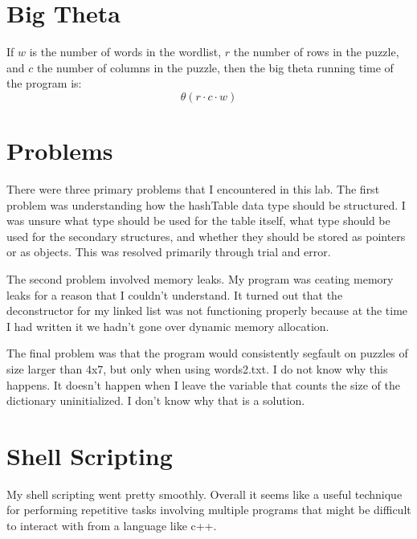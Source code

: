 \documentclass{article} %
\begin{document}
\section{Big Theta}
If $w$ is the number of words in the wordlist, $r$ the number of rows in the puzzle, and $c$ the number of columns in the puzzle, then the big theta running time of the program is:
$$\theta{(r \cdot c \cdot w)}$$

\section{Problems}
There were three primary problems that I encountered in this lab. The first problem was understanding how the hashTable data type should be structured. I was unsure what type should be used for the table itself, what type should be used for the secondary structures, and whether they should be stored as pointers or as objects. This was resolved primarily through trial and error.

The second problem involved memory leaks. My program was ceating memory leaks for a reason that I couldn't understand. It turned out that the deconstructor for my linked list was not functioning properly because at the time I had written it we hadn't gone over dynamic memory allocation.

The final problem was that the program would consistently segfault on puzzles of size larger than 4x7, but only when using words2.txt. I do not know why this happens. It doesn't happen when I leave the variable that counts the size of the dictionary uninitialized. I don't know why that is a solution.

\section{Shell Scripting}
My shell scripting went pretty smoothly. Overall it seems like a useful technique for performing repetitive tasks involving multiple programs that might be difficult to interact with from a language like c++.
\end{document}
